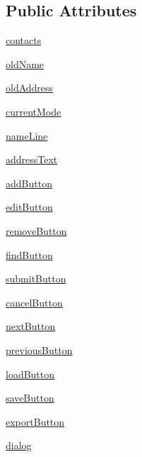 \subsection*{Public Attributes}
\begin{DoxyCompactItemize}
\item 
\hyperlink{classpart7_1_1AddressBook_aeeae9f287d05e98770dc59f2caf42ab9}{contacts}
\item 
\hyperlink{classpart7_1_1AddressBook_a4f92a3808a1682ce27529dcb85f4efc6}{old\+Name}
\item 
\hyperlink{classpart7_1_1AddressBook_a6e428825a4f168a5aa82a6b01e55a863}{old\+Address}
\item 
\hyperlink{classpart7_1_1AddressBook_aba1471cee26fb1bb8b3c024cb05b33a9}{current\+Mode}
\item 
\hyperlink{classpart7_1_1AddressBook_a59248f5afd164778c7eb04e9e1fa8fc3}{name\+Line}
\item 
\hyperlink{classpart7_1_1AddressBook_a0d18da7e850c74828057a6a3a2277dbb}{address\+Text}
\item 
\hyperlink{classpart7_1_1AddressBook_a169474df2865280930425303073e13e9}{add\+Button}
\item 
\hyperlink{classpart7_1_1AddressBook_a2809b07293eca71412af102422856c94}{edit\+Button}
\item 
\hyperlink{classpart7_1_1AddressBook_a7aa5abd2bbb2d3e8170aaff1f22cbc53}{remove\+Button}
\item 
\hyperlink{classpart7_1_1AddressBook_a8f71684dd98d4fa5434884215310f87d}{find\+Button}
\item 
\hyperlink{classpart7_1_1AddressBook_aed6a3f1cdeae5a4f3f6b21005010362d}{submit\+Button}
\item 
\hyperlink{classpart7_1_1AddressBook_ad22400896c1e17a99698af533f1873e1}{cancel\+Button}
\item 
\hyperlink{classpart7_1_1AddressBook_a9c8e19221f6b8df3c7611a0bb7c0d241}{next\+Button}
\item 
\hyperlink{classpart7_1_1AddressBook_ab584a75bd91805eb38b8a963a566bdb9}{previous\+Button}
\item 
\hyperlink{classpart7_1_1AddressBook_a9505ff4a0f265424e6cf00e7fea80855}{load\+Button}
\item 
\hyperlink{classpart7_1_1AddressBook_a35b228dd817f373e0b29d6cd4923c014}{save\+Button}
\item 
\hyperlink{classpart7_1_1AddressBook_a4522366143a4f3a4bd74aaaa6d592fd7}{export\+Button}
\item 
\hyperlink{classpart7_1_1AddressBook_a511e539ed95c2ecb210c53d86dd1f8d8}{dialog}
\end{DoxyCompactItemize}



